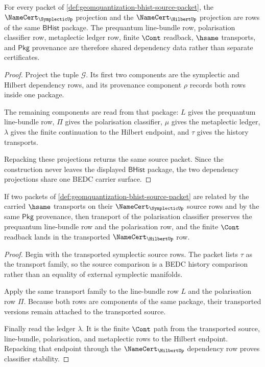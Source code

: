 \begin{theorem}
\label{thm:geomquantization-source-dependency-surface}
For every packet of \autoref{def:geomquantization-bhist-source-packet}, the $\NameCert_{\SymplecticUp}$ projection and the $\NameCert_{\HilbertUp}$ projection are rows of the same $\mathsf{BHist}$ package. The prequantum line-bundle row, polarisation classifier row, metaplectic ledger row, finite $\Cont$ readback, $\hsame$ transports, and $\mathsf{Pkg}$ provenance are therefore shared dependency data rather than separate certificates.
\end{theorem}
\begin{proof}
Project the tuple $\mathcal{G}$. Its first two components are the symplectic and Hilbert dependency rows, and its provenance component $\rho$ records both rows inside one package.

The remaining components are read from that package: $L$ gives the prequantum line-bundle row, $\Pi$ gives the polarisation classifier, $\mu$ gives the metaplectic ledger, $\lambda$ gives the finite continuation to the Hilbert endpoint, and $\tau$ gives the history transports.

Repacking these projections returns the same source packet. Since the construction never leaves the displayed $\mathsf{BHist}$ package, the two dependency projections share one BEDC carrier surface.
\end{proof}

\begin{theorem}
\label{thm:geomquantization-polarisation-classifier-stability}
If two packets of \autoref{def:geomquantization-bhist-source-packet} are related by the carried $\hsame$ transports on their $\NameCert_{\SymplecticUp}$ source rows and by the same $\mathsf{Pkg}$ provenance, then transport of the polarisation classifier preserves the prequantum line-bundle row and the polarisation row, and the finite $\Cont$ readback lands in the transported $\NameCert_{\HilbertUp}$ row.
\end{theorem}
\begin{proof}
Begin with the transported symplectic source rows. The packet lists $\tau$ as the transport family, so the source comparison is a BEDC history comparison rather than an equality of external symplectic manifolds.

Apply the same transport family to the line-bundle row $L$ and the polarisation row $\Pi$. Because both rows are components of the same package, their transported versions remain attached to the transported source.

Finally read the ledger $\lambda$. It is the finite $\Cont$ path from the transported source, line-bundle, polarisation, and metaplectic rows to the Hilbert endpoint. Repacking that endpoint through the $\NameCert_{\HilbertUp}$ dependency row proves classifier stability.
\end{proof}

